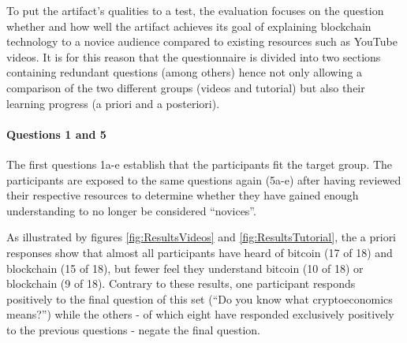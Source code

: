 To put the artifact's qualities to a test, the evaluation focuses on the question whether and how well the artifact achieves its goal of explaining blockchain technology to a novice audience compared to existing resources such as YouTube videos. It is for this reason that the questionnaire is divided into two sections containing redundant questions (among others) hence not only allowing a comparison of the two different groups (videos and tutorial) but also their learning progress (a priori and a posteriori).

\paragraph{Questions 1 and 5}The first questions 1a-e establish that the participants fit the target group. The participants are exposed to the same questions again (5a-e) after having reviewed their respective resources to determine whether they have gained enough understanding to no longer be considered \enquote{novices}.

As illustrated by figures \ref{fig:ResultsVideos} and \ref{fig:ResultsTutorial}, the a priori responses show that almost all participants have heard of bitcoin (17 of 18) and blockchain (15 of 18), but fewer feel they understand bitcoin (10 of 18) or blockchain (9 of 18). Contrary to these results, one participant responds positively to the final question of this set (\enquote{Do you know what cryptoeconomics means?}) while the others - of which eight have responded exclusively positively to the previous questions - negate the final question.

